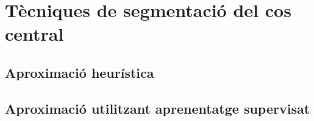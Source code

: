 \chapter{Tècniques de segmentació del cos central}
\label{cap:seg}

\section{Aproximació heurística}
\label{sec:seg_heur}

\section{Aproximació utilitzant aprenentatge supervisat}
\label{sec:seg_nn}